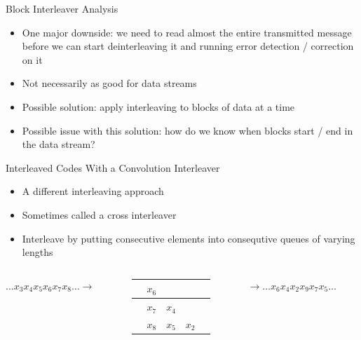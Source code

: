 \documentclass[aspectratio=169]{beamer}
\begin{document}
\begin{frame}{Block Interleaver Analysis}
    \begin{itemize}
        \item One major downside: we need to read almost the entire transmitted message before we can start deinterleaving it and running error detection / correction on it \pause
        \item Not necessarily as good for data streams \pause
        \item Possible solution: apply interleaving to blocks of data at a time \pause
        \item Possible issue with this solution: how do we know when blocks start / end in the data stream?
    \end{itemize}
\end{frame}


\begin{frame}{Interleaved Codes With a Convolution Interleaver}
    \begin{itemize}
        \item A different interleaving approach
        \item Sometimes called a cross interleaver
        \item Interleave by putting consecutive elements into consequtive queues of varying lengths
    \end{itemize}

    \bigskip

    \begin{columns}[c]
    \begin{column}{3cm}
        $\ldots x_3 x_4 x_5 x_6 x_7 x_8 \ldots \to$
    \end{column}
    \hfill
    \begin{column}{5cm}
    \begin{table}
        \centering
        \begin{tabular}{c|c|c|c|c}
            \hline
            & $x_6$ \\ \hline
            & $x_7$ & $x_4$ \\ \hline
            & $x_8$ & $x_5$ & $x_2$ & \\ \hline
        \end{tabular}
    \end{table}
    \end{column}
    \hfill
    \begin{column}{5cm}
        $\to \ldots x_6 x_4 x_2 x_9 x_7 x_5 \ldots$
    \end{column}
    \end{columns}
\end{frame}
\end{document}

